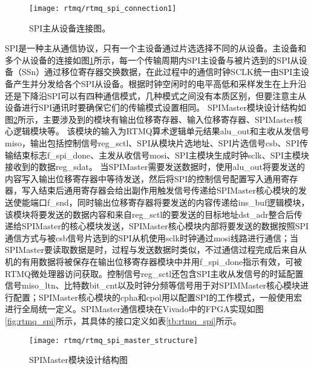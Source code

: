 \begin{figure}
    \centering
    \caption[SPI主从设备连接图]{SPI主从设备连接图。\label{fig:rtmq_spi_connection1}}
    \texttt{[image: rtmq/rtmq\_spi\_connection1]}
\end{figure}

SPI是一种主从通信协议，只有一个主设备通过片选选择不同的从设备。主设备和多个从设备的连接如图\ref{fig:rtmq_spi_connection1}所示，每一个传输周期内SPI主设备与被片选到的SPI从设备（SSn）通过移位寄存器交换数据，在此过程中的通信时钟SCLK统一由SPI主设备产生并分发给各个SPI从设备。根据时钟空闲时的电平高低和采样发生在上升沿还是下降沿SPI可以有四种通信模式，几种模式之间没有本质区别，但要注意主从设备进行SPI通讯时要确保它们的传输模式设置相同。
SPIMaster模块设计结构如图\ref{fig:rtmq_spi_master_structure}所示，主要涉及到的模块有输出位移寄存器、输入位移寄存器、SPIMaster核心逻辑模块等。
该模块的输入为RTMQ算术逻辑单元结果alu\_out和主收从发信号miso，输出包括控制信号reg\_sctl、SPI从模块片选地址、SPI片选信号csb、SPI传输结束标志f\_spi\_done、主发从收信号mosi、SPI主模块生成时钟sclk、SPI主模块接收到的数据reg\_sdat。
当SPIMaster需要发送数据时，使用alu\_out将要发送的内容写入输出位移寄存器中等待发送，然后将SPI的控制信号配置写入通用寄存器，写入结束后通用寄存器会给出副作用触发信号传递给SPIMaster核心模块的发送使能端口f\_snd，同时输出位移寄存器将要发送的内容传递给ins\_buf逻辑模块，该模块将要发送的数据内容和来自reg\_sctl的要发送的目标地址dst\_adr整合后传递给SPIMaster的核心模块发送，SPIMaster核心模块内部将要发送的数据按照SPI通信方式与被csb信号片选到的SPI从机使用sclk时钟通过mosi线路进行通信；当SPIMaster要读取数据是时，过程与发送数据时类似，不过通信过程完成后来自从机的有用数据将被保存在输出位移寄存器模块中并用f\_spi\_done指示有效，可被RTMQ微处理器访问获取。控制信号reg\_sctl还包含SPI主收从发信号的时延配置信号miso\_ltn、比特数bit\_cnt以及时钟分频等信号用于对SPIMMaster核心模块进行配置；SPIMaster核心模块的cpha和cpol用以配置SPI的工作模式，一般使用宏进行全局统一定义。SPIMaster通信模块在Vivado中的FPGA实现如图\ref{fig:rtmq_spi}所示，其具体的接口定义如表\ref{tb:rtmq_spi}所示。



\begin{figure}
    \centering
    \caption[SPIMaster模块设计结构图]{SPIMaster模块设计结构图\label{fig:rtmq_spi_master_structure}}
    \texttt{[image: rtmq/rtmq\_spi\_master\_structure]}
\end{figure}


